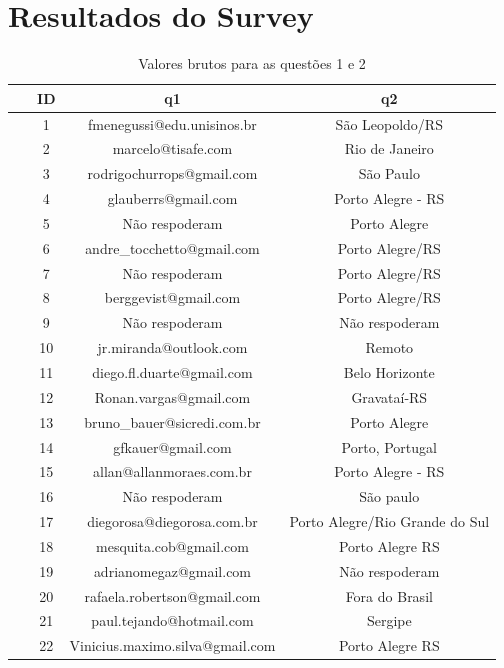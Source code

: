 \documentclass[twoside,english,brazilian]{UNISINOSartigo}
\begin{document}


\section{Resultados do Survey}

\begin{table}[h]
\footnotesize
    \caption{Valores brutos para as questões 1 e 2}
    \begin{tabularx}{\columnwidth}{cccc}
    \hline
 ~ & ID & q1 & q2 \\ \hline
 ~ & 1 & fmenegussi@edu.unisinos.br & São Leopoldo/RS \\
 ~ & 2 & marcelo@tisafe.com & Rio de Janeiro \\
 ~ & 3 & rodrigochurrops@gmail.com & São Paulo  \\
 ~ & 4 & glauberrs@gmail.com & Porto Alegre - RS \\
 ~ & 5 & Não respoderam & Porto Alegre  \\
 ~ & 6 & andre\_tocchetto@gmail.com & Porto Alegre/RS \\
 ~ & 7 & Não respoderam & Porto Alegre/RS \\
 ~ & 8 & berggevist@gmail.com & Porto Alegre/RS \\
 ~ & 9 & Não respoderam & Não respoderam \\
 ~ & 10 & jr.miranda@outlook.com  & Remoto  \\
 ~ & 11 & diego.fl.duarte@gmail.com & Belo Horizonte \\
 ~ & 12 & Ronan.vargas@gmail.com & Gravataí-RS \\
 ~ & 13 & bruno\_bauer@sicredi.com.br & Porto Alegre \\
 ~ & 14 & gfkauer@gmail.com & Porto, Portugal \\
 ~ & 15 & allan@allanmoraes.com.br & Porto Alegre - RS \\
 ~ & 16 & Não respoderam & São paulo \\
 ~ & 17 & diegorosa@diegorosa.com.br & Porto Alegre/Rio Grande do Sul \\
 ~ & 18 & mesquita.cob@gmail.com & Porto Alegre RS \\
 ~ & 19 & adrianomegaz@gmail.com & Não respoderam \\
 ~ & 20 & rafaela.robertson@gmail.com & Fora do Brasil \\
 ~ & 21 & paul.tejando@hotmail.com & Sergipe \\
 ~ & 22 & Vinicius.maximo.silva@gmail.com  & Porto Alegre RS \\

\end{tabularx}
\end{table}
\end{document}
